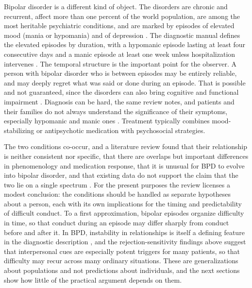 \documentclass[11pt]{article}
\theoremstyle{definition}
\theoremstyle{remark}
\begin{document}
Bipolar disorder is a different kind of object. The disorders are chronic and recurrent, affect more than one percent of the world population, are among the most heritable psychiatric conditions, and are marked by episodes of elevated mood (mania or hypomania) and of depression \citep{vieta2018}. The diagnostic manual defines the elevated episodes by duration, with a hypomanic episode lasting at least four consecutive days and a manic episode at least one week unless hospitalization intervenes \citep{dsm5tr}. The temporal structure is the important point for the observer. A person with bipolar disorder who is between episodes may be entirely reliable, and may deeply regret what was said or done during an episode. That is possible and not guaranteed, since the disorders can also bring cognitive and functional impairment \citep{vieta2018}. Diagnosis can be hard, the same review notes, and patients and their families do not always understand the significance of their symptoms, especially hypomanic and manic ones \citep{vieta2018}. Treatment typically combines mood-stabilizing or antipsychotic medication with psychosocial strategies.

The two conditions co-occur, and a literature review found that their relationship is neither consistent nor specific, that there are overlaps but important differences in phenomenology and medication response, that it is unusual for BPD to evolve into bipolar disorder, and that existing data do not support the claim that the two lie on a single spectrum \citep{paris2007}. For the present purposes the review licenses a modest conclusion: the conditions should be handled as separate hypotheses about a person, each with its own implications for the timing and predictability of difficult conduct. To a first approximation, bipolar episodes organize difficulty in time, so that conduct during an episode may differ sharply from conduct before and after it. In BPD, instability in relationships is itself a defining feature in the diagnostic description \citep{dsm5tr}, and the rejection-sensitivity findings above suggest that interpersonal cues are especially potent triggers for many patients, so that difficulty may recur across many ordinary situations. These are generalizations about populations and not predictions about individuals, and the next sections show how little of the practical argument depends on them.
\end{document}
